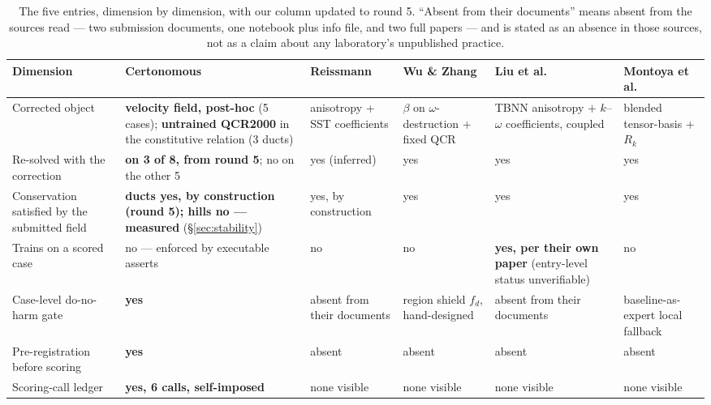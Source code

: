 \documentclass[11pt,a4paper]{article}
\begin{document}
\begin{table}[h]
\centering
\footnotesize
\caption{The five entries, dimension by dimension, with our column updated to round 5.
``Absent from their documents'' means absent from the sources read --- two submission
documents, one notebook plus info file, and two full papers --- and is stated as an absence
in those sources, not as a claim about any laboratory's unpublished practice.}
\label{tab:dimensions}
\begin{tabular}{L{2.3cm}L{2.5cm}L{2.1cm}L{2.1cm}L{2.1cm}L{2.1cm}}
\toprule
Dimension & \textbf{Certonomous} & Reissmann & Wu \& Zhang & Liu et al. & Montoya et al. \\
\midrule
Corrected object &
\textbf{velocity field, post-hoc} (5 cases); \textbf{untrained QCR2000} in the constitutive
relation (3 ducts) &
anisotropy + SST coefficients &
$\beta$ on $\omega$-destruction + fixed QCR &
TBNN anisotropy $+$ $k$--$\omega$ coefficients, coupled &
blended tensor-basis + $R_k$ \\
\addlinespace
Re-solved with the correction &
\textbf{on 3 of 8, from round 5}; no on the other 5 &
yes (inferred) & yes & yes & yes \\
\addlinespace
Conservation satisfied by the submitted field &
\textbf{ducts yes, by construction (round 5); hills no --- measured}
(\S\ref{sec:stability}) &
yes, by construction & yes & yes & yes \\
\addlinespace
Trains on a scored case &
no --- enforced by executable asserts &
no & no &
\textbf{yes, per their own paper} (entry-level status unverifiable) &
no \\
\addlinespace
Case-level do-no-harm gate &
\textbf{yes} &
absent from their documents &
region shield $f_d$, hand-designed &
absent from their documents &
baseline-as-expert local fallback \\
\addlinespace
Pre-registration before scoring &
\textbf{yes} & absent & absent & absent & absent \\
\addlinespace
Scoring-call ledger &
\textbf{yes, 6 calls, self-imposed} &
none visible & none visible & none visible & none visible \\
\bottomrule
\end{tabular}
\end{table}
\end{document}
